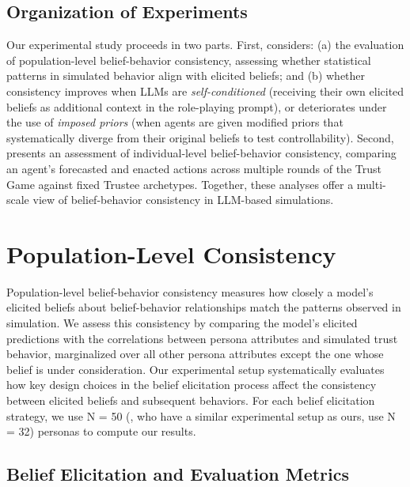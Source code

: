 \documentclass{article} %
\begin{document}
\subsection{Organization of Experiments}
Our experimental study proceeds in two parts. First,  considers: (a) the evaluation of population-level belief-behavior consistency, assessing whether statistical patterns in simulated behavior align with elicited beliefs; and (b) whether consistency improves when LLMs are \textit{self-conditioned} (receiving their own elicited beliefs as additional context in the role-playing prompt), or deteriorates under the use of \textit{imposed priors} (when agents are given modified priors that systematically diverge from their original beliefs to test controllability). Second,  presents an assessment of individual-level belief-behavior consistency, comparing an agent's forecasted and enacted actions across multiple rounds of the Trust Game against fixed Trustee archetypes. Together, these analyses offer a multi-scale view of belief-behavior consistency in LLM-based simulations.


\section{Population-Level Consistency}
\label{sec:agg-level}

Population-level belief-behavior consistency measures how closely a model's elicited beliefs about belief-behavior relationships match the patterns observed in simulation. We assess this consistency by comparing the model’s elicited predictions with the correlations between persona attributes and simulated trust behavior, marginalized over all other persona attributes except the one whose belief is under consideration.
Our experimental setup systematically evaluates how key design choices in the belief elicitation process affect the consistency between elicited beliefs and subsequent behaviors. For each belief elicitation strategy, we use N = 50 (\citet{wang2023incharacter}, who have a similar experimental setup as ours, use N = 32) personas to compute our results.

\subsection{Belief Elicitation and Evaluation Metrics}
\label{subsec:pop-eval}
\end{document}
